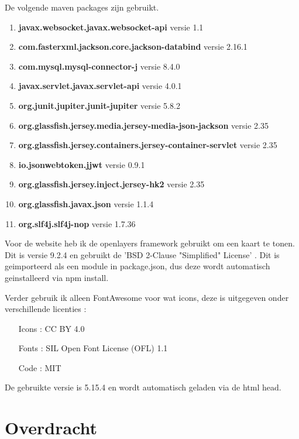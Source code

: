 \documentclass{article}
\begin{document}
De volgende maven packages zijn gebruikt.
\begin{enumerate}
    \item \textbf{javax.websocket.javax.websocket-api} versie 1.1
    \item \textbf{com.fasterxml.jackson.core.jackson-databind} versie 2.16.1
    \item \textbf{com.mysql.mysql-connector-j} versie 8.4.0
    \item \textbf{javax.servlet.javax.servlet-api} versie 4.0.1
    \item \textbf{org.junit.jupiter.junit-jupiter} versie 5.8.2
    \item \textbf{org.glassfish.jersey.media.jersey-media-json-jackson} versie 2.35
    \item \textbf{org.glassfish.jersey.containers.jersey-container-servlet} versie 2.35
    \item \textbf{io.jsonwebtoken.jjwt} versie 0.9.1
    \item \textbf{org.glassfish.jersey.inject.jersey-hk2} versie 2.35
    \item \textbf{org.glassfish.javax.json} versie 1.1.4
    \item \textbf{org.slf4j.slf4j-nop} versie 1.7.36
\end{enumerate}

Voor de website heb ik de openlayers framework gebruikt om een kaart te tonen.
Dit is versie 9.2.4 en gebruikt de 'BSD 2-Clause "Simplified" License' \parencite{ol_license}. Dit is geimporteerd als een module in package.json, dus deze wordt automatisch geinstalleerd via npm install.
\par\smallskip
Verder gebruik ik alleen FontAwesome voor wat icons, deze is uitgegeven onder verschillende licenties \parencite{fontawesome_license}:
\begin{itemize}
    \item[Icons]: CC BY 4.0
    \item[Fonts]: SIL Open Font License (OFL) 1.1
    \item[Code]: MIT 
\end{itemize}
De gebruikte versie is 5.15.4 en wordt automatisch geladen via de html head.

\section{Overdracht} 
\end{document}

